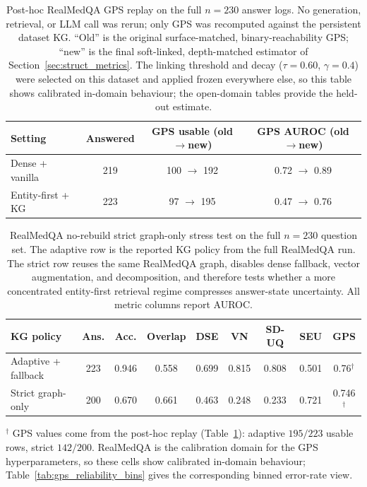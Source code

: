 \begin{table}[t]
\centering
\small
\caption{Post-hoc RealMedQA GPS replay on the full $n=230$ answer logs.
No generation, retrieval, or LLM call was rerun; only GPS
was recomputed against the persistent dataset KG.
``Old'' is the original surface-matched, binary-reachability GPS;
``new'' is the final soft-linked, depth-matched estimator of
Section~\ref{sec:struct_metrics}.
The linking threshold and decay ($\tau=0.60$, $\gamma=0.4$) were selected on
this dataset and applied frozen everywhere else, so this table shows
calibrated in-domain behaviour; the open-domain tables provide the held-out
estimate.
\label{tab:realmedqa_replay}}
\begin{tabular}{@{}lccc@{}}
\toprule
Setting & Answered & GPS usable (old$\rightarrow$new) & GPS AUROC (old$\rightarrow$new) \\
\midrule
Dense + vanilla & 219 & 100 $\rightarrow$ 192 & 0.72 $\rightarrow$ 0.89 \\
Entity-first + KG & 223 & 97 $\rightarrow$ 195 & 0.47 $\rightarrow$ 0.76 \\
\bottomrule
\end{tabular}
\end{table}

\begin{table}[t]
\centering
\small
\caption{RealMedQA no-rebuild strict graph-only stress test on the full
$n=230$ question set.
The adaptive row is the reported KG policy from the full RealMedQA run.
The strict row reuses the same RealMedQA graph, disables dense fallback,
vector augmentation, and decomposition, and therefore tests whether a more
concentrated entity-first retrieval regime compresses answer-state
uncertainty.
All metric columns report AUROC.
\label{tab:realmedqa_strict_entity}}
\setlength{\tabcolsep}{3.5pt}
\begin{tabular}{@{}lcccccccc@{}}
\toprule
KG policy & Ans. & Acc. & Overlap & DSE & VN & SD-UQ & SEU & GPS \\
\midrule
Adaptive + fallback & 223 & 0.946 & 0.558 & 0.699 & 0.815 & 0.808 & 0.501 & 0.76$^\dagger$ \\
Strict graph-only & 200 & 0.670 & 0.661 & 0.463 & 0.248 & 0.233 & 0.721 & 0.746$^\dagger$ \\
\bottomrule
\end{tabular}

\vspace{0.4em}
\raggedright\footnotesize
$^\dagger$ GPS values come from the post-hoc replay
(Table~\ref{tab:realmedqa_replay}): adaptive $195/223$ usable rows, strict
$142/200$.
RealMedQA is the calibration domain for the GPS hyperparameters, so these
cells show calibrated in-domain behaviour; Table~\ref{tab:gps_reliability_bins}
gives the corresponding binned error-rate view.
\end{table}

